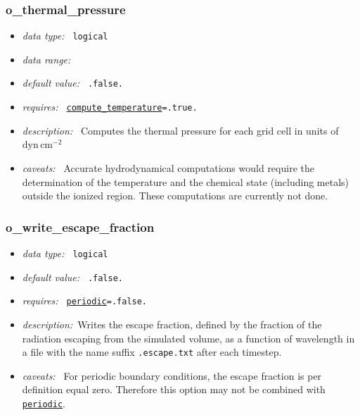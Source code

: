 \documentclass[a4paper,10pt]{article}
\begin{document}
\subsubsection{o\_thermal\_pressure}
\label{opt:othermalpressure}
\begin{itemize}
 \item \textit{data type:~} \texttt{logical}
 \item \textit{data range:~}
 \item \textit{default value:~} \texttt{.false.}
 \item \textit{requires:~} \texttt{\hyperref[opt:periodic]{compute\_temperature}=.true.}
 \item \textit{description:~} Computes the thermal pressure for each grid cell 
  in units of $\mathrm{dyn\,cm^{-2}}$ 
 \item \textit{caveats:~} Accurate hydrodynamical computations would require the 
  determination of the temperature and the chemical state (including metals) 
  outside the ionized region. These computations are currently not done.
\end{itemize}


\subsubsection{o\_write\_escape\_fraction}
\label{opt:owriteescapefraction}
\begin{itemize}
 \item \textit{data type:~} \texttt{logical}
 \item \textit{default value:~} \texttt{.false.}
 \item \textit{requires:~} \texttt{\hyperref[opt:periodic]{periodic}=.false.}
 \item \textit{description:~}Writes the escape fraction, defined by the fraction 
  of the radiation escaping from the simulated volume, as a function of 
  wavelength in a file with the name suffix \texttt{.escape.txt} after each 
  timestep.
 \item \textit{caveats:~} For periodic boundary conditions, the escape fraction  
  is per definition equal zero. Therefore this option may not be combined with 
  \texttt{\hyperref[opt:periodic]{periodic}}.
\end{itemize}
\end{document}
